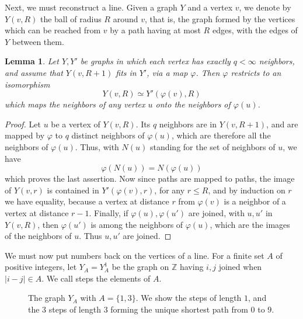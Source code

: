 \documentclass[11pt,a4paper]{article}
\newtheorem{lem}[thm]{Lemma}
\begin{document}
Next, we must reconstruct a line. Given a graph $Y$ and a vertex $v$, we denote by $Y(v,R)$ the ball of radius $R$ around $v$, that is, the graph formed by the vertices which can be reached from $v$ by a path having at most $R$ edges, with the edges of $Y$ between them.

\begin{lem}\label{balls}
Let $Y,Y'$ be graphs in which each vertex has exactly $q<\infty$ neighbors, and assume that $Y(v,R+1)$ fits in $Y'$, via a map $\varphi$. Then $\varphi$ restricts to an isomorphism
\[
 Y(v,R)\simeq Y'(\varphi(v),R)
\]
which maps the neighbors of any vertex $u$ onto the neighbors of $\varphi(u)$.
\end{lem}

\begin{proof}
Let $u$ be a vertex of $Y(v,R)$. Its $q$ neighbors are in $Y(v,R+1)$, and are mapped by $\varphi$ to $q$ distinct neighbors of $\varphi(u)$, which are therefore all the neighbors of $\varphi(u)$. Thus, with $N(u)$ standing for the set of neighbors of $u$, we have
\[
 \varphi(N(u))=N(\varphi(u))
\]
which proves the last assertion. Now since paths are mapped to paths, the image of $Y(v,r)$ is contained in $Y'(\varphi(v),r)$, for any $r\leq R$, and by induction on $r$ we have equality, because a vertex at distance $r$ from $\varphi(v)$ is a neighbor of a vertex at distance $r-1$. Finally, if $\varphi(u),\varphi(u')$ are joined, with $u,u'$ in $Y(v,R)$, then $\varphi(u')$ is among the neighbors of $\varphi(u)$, which are the images of the neighbors of $u$. Thus $u,u'$ are joined.
\end{proof}

We must now put numbers back on the vertices of a line. For a finite set $A$ of positive integers, let $Y_A=Y_A^1$ be the graph on $\mathbb Z$ having $i,j$ joined when $|i-j|\in A$. We call steps the elements of $A$.

\begin{figure}[H]\centering
{}
\caption{The graph $Y_A$ with $A=\{1,3\}$. We show the steps of length $1$, and the 3 steps of length $3$ forming the unique shortest path from $0$ to $9$.}
\label{long-steps}
\end{figure}
\end{document}
